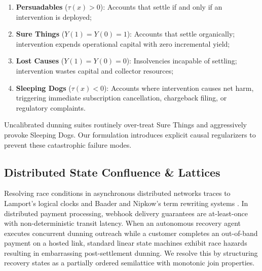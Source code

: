 \documentclass[10pt, twocolumn, a4paper]{article}
\begin{document}
\begin{enumerate}[leftmargin=*]
  \item \textbf{Persuadables} ($\tau(x) > 0$): Accounts that settle if and only if an intervention is deployed;
  \item \textbf{Sure Things} ($Y(1) = Y(0) = 1$): Accounts that settle organically; intervention expends operational capital with zero incremental yield;
  \item \textbf{Lost Causes} ($Y(1) = Y(0) = 0$): Insolvencies incapable of settling; intervention wastes capital and collector resources;
  \item \textbf{Sleeping Dogs} ($\tau(x) < 0$): Accounts where intervention causes net harm, triggering immediate subscription cancellation, chargeback filing, or regulatory complaints.
\end{enumerate}

Uncalibrated dunning suites routinely over-treat Sure Things and aggressively provoke Sleeping Dogs. Our formulation introduces explicit causal regularizers to prevent these catastrophic failure modes.

\subsection{Distributed State Confluence \& Lattices}
Resolving race conditions in asynchronous distributed networks traces to Lamport's logical clocks \citep{lamport1978time} and Baader and Nipkow's term rewriting systems \citep{baader1998term}. In distributed payment processing, webhook delivery guarantees are at-least-once with non-deterministic transit latency. When an autonomous recovery agent executes concurrent dunning outreach while a customer completes an out-of-band payment on a hosted link, standard linear state machines exhibit race hazards resulting in embarrassing post-settlement dunning. We resolve this by structuring recovery states as a partially ordered semilattice with monotonic join properties.
\end{document}
